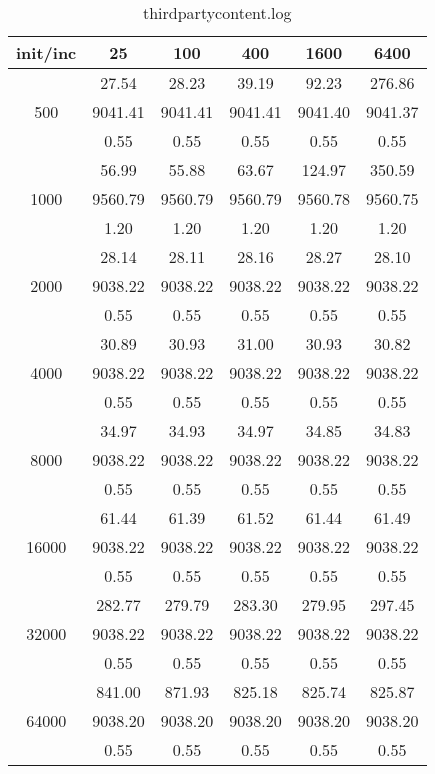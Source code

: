 \begin{table}[th]
\caption{thirdpartycontent.log}
\label{tab:thirdpartycontent.log}
\centering
\begin{tabular}{|c||c|c|c|c|c|}
\hline
init/inc & 25 & 100 & 400 & 1600 & 6400 \\ \hline \hline
  & 27.54 & 28.23 & 39.19 & 92.23 & 276.86\\ 
500  & 9041.41 & 9041.41 & 9041.41 & 9041.40 & 9041.37\\ 
  & 0.55 & 0.55 & 0.55 & 0.55 & 0.55\\ \hline 
  & 56.99 & 55.88 & 63.67 & 124.97 & 350.59\\ 
1000  & 9560.79 & 9560.79 & 9560.79 & 9560.78 & 9560.75\\ 
  & 1.20 & 1.20 & 1.20 & 1.20 & 1.20\\ \hline 
  & 28.14 & 28.11 & 28.16 & 28.27 & 28.10\\ 
2000  & 9038.22 & 9038.22 & 9038.22 & 9038.22 & 9038.22\\ 
  & 0.55 & 0.55 & 0.55 & 0.55 & 0.55\\ \hline 
  & 30.89 & 30.93 & 31.00 & 30.93 & 30.82\\ 
4000  & 9038.22 & 9038.22 & 9038.22 & 9038.22 & 9038.22\\ 
  & 0.55 & 0.55 & 0.55 & 0.55 & 0.55\\ \hline 
  & 34.97 & 34.93 & 34.97 & 34.85 & 34.83\\ 
8000  & 9038.22 & 9038.22 & 9038.22 & 9038.22 & 9038.22\\ 
  & 0.55 & 0.55 & 0.55 & 0.55 & 0.55\\ \hline 
  & 61.44 & 61.39 & 61.52 & 61.44 & 61.49\\ 
16000  & 9038.22 & 9038.22 & 9038.22 & 9038.22 & 9038.22\\ 
  & 0.55 & 0.55 & 0.55 & 0.55 & 0.55\\ \hline 
  & 282.77 & 279.79 & 283.30 & 279.95 & 297.45\\ 
32000  & 9038.22 & 9038.22 & 9038.22 & 9038.22 & 9038.22\\ 
  & 0.55 & 0.55 & 0.55 & 0.55 & 0.55\\ \hline 
  & 841.00 & 871.93 & 825.18 & 825.74 & 825.87\\ 
64000  & 9038.20 & 9038.20 & 9038.20 & 9038.20 & 9038.20\\ 
  & 0.55 & 0.55 & 0.55 & 0.55 & 0.55\\ \hline 
\end{tabular}
\end{table}

